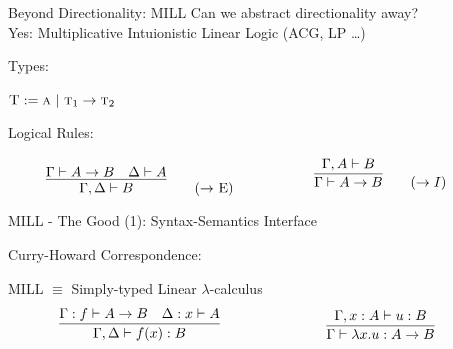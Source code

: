 \documentclass{beamer}
\newlength{\arrow}
\begin{document}
\begin{frame}{Beyond Directionality: MILL}
Can we abstract directionality away?\\
\pause
Yes: \alert{Multiplicative Intuionistic Linear Logic} (ACG, LP \dots)

\pause

Types:
\begin{center}{
$\textsc{T} := \textsc{a} \ | \ \textsc{t}_1 \to \textsc{t}_2 $}
\end{center}

\pause	

Logical Rules:
\begin{align*}
    \begin{minipage}{0.5\textwidth}
\[
        \infer{\Gamma, \Delta \vdash B}{
            \Gamma \vdash A \rightarrow B
            &
            \Delta \vdash A
        }\tag{$\rightarrow$ E}
    \]
    \end{minipage}    \begin{minipage}{0.5\textwidth}
    \[
        \infer{\Gamma \vdash A \rightarrow B}{
            \Gamma, A \vdash B
        }\tag{$\rightarrow I$}\\
    \]
    \end{minipage}
\end{align*}
\end{frame}

\begin{frame}{MILL - The Good (1): Syntax-Semantics Interface}

	Curry-Howard Correspondence:

\begin{center}{
MILL $\equiv$ Simply-typed Linear $\lambda$-calculus}
\pause
\begin{align*}
    \begin{minipage}{0.5\textwidth}
		\[
	        \infer{\Gamma, \Delta \vdash f(x): B}{
	            \Gamma: f \vdash A \rightarrow B
	            &
	            \Delta: x \vdash A
	        }
	    \]
	    \end{minipage}    \begin{minipage}{0.5\textwidth}
	    \[
	        \infer{\Gamma \vdash \lambda x. u : A \rightarrow B}{
	            \Gamma, x: A \vdash u: B
	        }
	    \]
    	\end{minipage}
\end{align*}

\large
\smiley	
\vfill
\end{center}
\end{frame}
\end{document}
